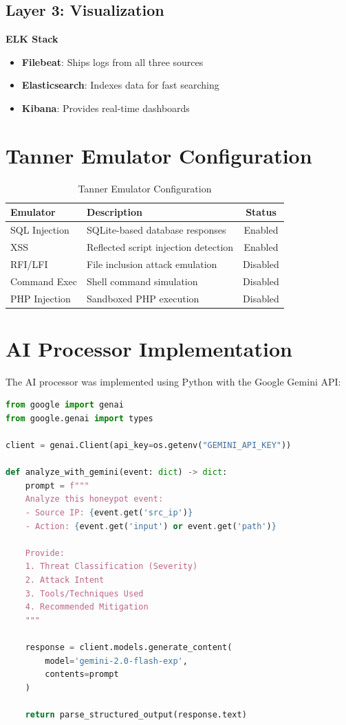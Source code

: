\documentclass[12pt,a4paper]{report}
\begin{document}
\subsection*{Layer 3: Visualization}

\textbf{ELK Stack}
\begin{itemize}
\item \textbf{Filebeat}: Ships logs from all three sources
\item \textbf{Elasticsearch}: Indexes data for fast searching
\item \textbf{Kibana}: Provides real-time dashboards
\end{itemize}

\section{Tanner Emulator Configuration}

\begin{table}[h]
\centering
\caption{Tanner Emulator Configuration}
\label{tab:tanner_emulators}
\begin{tabular}{|l|p{6cm}|c|}
\hline
\textbf{Emulator} & \textbf{Description} & \textbf{Status} \\
\hline
SQL Injection & SQLite-based database responses & Enabled \\
\hline
XSS & Reflected script injection detection & Enabled \\
\hline
RFI/LFI & File inclusion attack emulation & Disabled \\
\hline
Command Exec & Shell command simulation & Disabled \\
\hline
PHP Injection & Sandboxed PHP execution & Disabled \\
\hline
\end{tabular}
\end{table}

\section{AI Processor Implementation}

The AI processor was implemented using Python with the Google Gemini API:

\begin{lstlisting}[language=Python, caption=AI Processor Core Logic]
from google import genai
from google.genai import types

client = genai.Client(api_key=os.getenv("GEMINI_API_KEY"))

def analyze_with_gemini(event: dict) -> dict:
    prompt = f"""
    Analyze this honeypot event:
    - Source IP: {event.get('src_ip')}
    - Action: {event.get('input') or event.get('path')}
    
    Provide:
    1. Threat Classification (Severity)
    2. Attack Intent
    3. Tools/Techniques Used
    4. Recommended Mitigation
    """
    
    response = client.models.generate_content(
        model='gemini-2.0-flash-exp',
        contents=prompt
    )
    
    return parse_structured_output(response.text)
\end{lstlisting}
\end{document}
